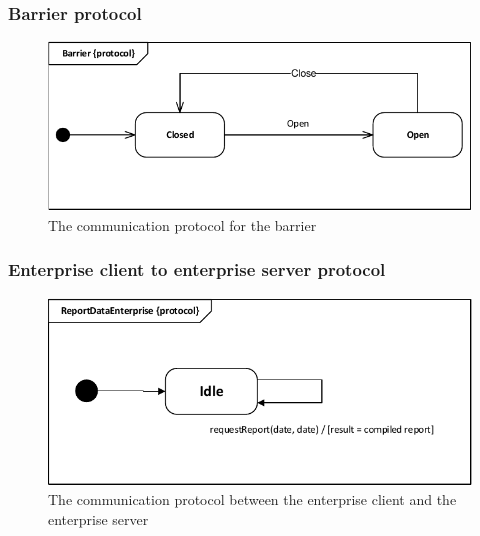 \subsubsection*{Barrier protocol}
\begin{figure}[H]
\centering
\includegraphics[width=0.7\linewidth]{img/behaviour_state_machines/protocol_state_machines/protocol_state_machine_barrier}
\caption{The communication protocol for the barrier}
\label{fig:protocol_state_machine_barrier}
\end{figure}

\subsubsection*{Enterprise client to enterprise server protocol}
\begin{figure}[H]
\centering
\includegraphics[width=0.7\linewidth]{img/behaviour_state_machines/protocol_state_machines/protocol_state_machine_enterprise_server_to_enterprise_client}
\caption{The communication protocol between the enterprise client and the enterprise server}
\label{fig:protocol_state_machine_enterprise_server_to_enterprise_client}
\end{figure}

